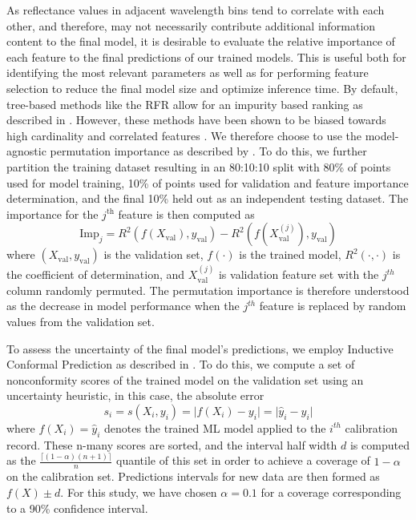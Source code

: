\documentclass[sensors,article,submit,pdftex,moreauthors]{Definitions/mdpi}
\begin{document}
As reflectance values in adjacent wavelength bins tend to correlate with each other, and therefore, may not necessarily contribute additional information content to the final model, it is desirable to evaluate the relative importance of each feature to the final predictions of our trained models. This is useful both for identifying the most relevant parameters as well as for performing feature selection to reduce the final model size and optimize inference time. By default, tree-based methods like the RFR allow for an impurity based ranking as described in \cite{random-forest, rfr-importance-ranking}. However, these methods have been shown to be biased towards high cardinality and correlated features \cite{strobl2008conditional}. We therefore choose to use the model-agnostic permutation importance as described by \cite{parr2018beware}. To do this, we further partition the training dataset resulting in an 80:10:10 split with 80\% of points used for model training, 10\% of points used for validation and feature importance determination, and the final 10\% held out as an independent testing dataset. The importance for the $j^{\text{th}}$ feature is then computed as
\begin{equation}
    \text{Imp}_j = R^2(f(X_{\text{val}}), y_{\text{val}}) - R^2(f(X_{\text{val}}^{(j)}), y_{\text{val}})
\end{equation}
where $(X_{\text{val}}, y_{\text{val}})$ is the validation set, $f(\cdot)$ is the trained model, $R^2(\cdot, \cdot)$ is the coefficient of determination, and $X_{\text{val}}^{(j)}$ is validation feature set with the $j^{th}$ column randomly permuted. The permutation importance is therefore understood as the decrease in model performance when the $j^{th}$ feature is replaced by random values from the validation set.

To assess the uncertainty of the final model's predictions, we employ Inductive Conformal Prediction as described in \cite{conformal-prediction-1, conformal-prediction-2, conformal-prediction-3, conformal-prediction-4}. To do this, we compute a set of nonconformity scores of the trained model on the validation set using an uncertainty heuristic, in this case, the absolute error
\begin{equation}
    s_i = s(X_i, y_i) = \lvert f(X_i) - y_i \rvert = \lvert \hat{y}_i - y_i \rvert
\end{equation}
where $f(X_i)=\hat{y}_i$ denotes the trained ML model applied to the $i^{th}$ calibration record. These n-many scores are sorted, and the interval half width $d$ is computed as the $\frac{\lceil(1-\alpha)(n+1) \rceil}{n}$ quantile of this set in order to achieve a coverage of $1-\alpha$ on the calibration set. Predictions intervals for new data are then formed as $f(X)\pm d$. For this study, we have chosen $\alpha=0.1$ for a coverage corresponding to a 90\% confidence interval.
\end{document}
